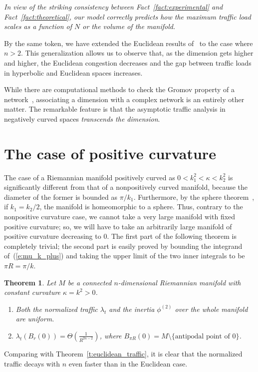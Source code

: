 \documentclass{article}
\newtheorem{theorem}{Theorem}
\begin{document}
\textit{In view of the striking consistency between Fact~\ref{fact:experimental} and Fact~\ref{fact:theoretical}, 
our model correctly predicts how the maximum traffic load scales as a function of $N$ 
or the volume of the manifold.} 

By the same token, we have extended the Euclidean results of~\cite{arXiv_dmitri} to the case where $n>2$. 
This generalization allows us to observe that,  
as the dimension gets higher and higher, 
the Euclidean congestion decreases and the gap between traffic loads in hyperbolic and Euclidean spaces increases. 

While there are computational methods 
to check the Gromov property of a network~\cite{scaled_gromov,Matt_thesis,eurasip_clustering,4_point}, 
associating a dimension with a complex network is an entirely other matter. 
The remarkable feature is that the asymptotic traffic analysis in negatively curved spaces 
\textit{transcends the dimension}. 

\section{The case of positive curvature}

The case of a Riemannian manifold positively curved as $0 < k_1^2 < \kappa < k_2^2$ is significantly different from that of a nonpositively curved manifold, 
because the diameter of the former is bounded as $\pi/k_1$. Furthermore, by the sphere theorem~\cite[Chap. 13]{docarmo}, 
if $k_1=k_2/2$, the manifold is homeomorphic to a sphere. 
Thus, contrary to the nonpositive curvature case, we cannot take a very large manifold with fixed positive curvature;  
so, we will have to take an arbitrarily large manifold of positive curvature decreasing to $0$. 
The first part of the following theorem is completely trivial; the second part is easily proved 
by bounding the integrand of~(\ref{e:mu_k_plus}) and taking the upper limit of the two inner integrals to be 
$\pi R=\pi/k$. 

\begin{theorem}
Let $M$ be a connected $n$-dimensional Riemannian manifold with constant curvature $\kappa=k^2>0$. 
\begin{enumerate}
\item Both the normalized traffic $\lambda_t$ and the inertia $\phi^{(2)}$ over the whole manifold are uniform.
\item $\lambda_t(B_r(0))=\Theta\left(\frac{1}{R^{2n-2}}\right)$, 
where $B_{\pi R}(0)=M\setminus \{\mbox{antipodal point of } 0\}$.  
\end{enumerate} 
\end{theorem}
\noindent
Comparing with Theorem~\ref{t:euclidean_traffic}, 
it is clear that the normalized traffic decays with $n$ even faster than in the Euclidean case. 
\end{document}
